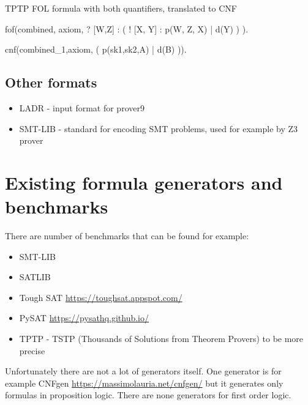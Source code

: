\begin{listing}[H]
  \caption{TPTP FOL formula with both quantifiers, translated to CNF}
\begin{tptpcode}
fof(combined, axiom,
 ? [W,Z] : ( ! [X, Y] : p(W, Z, X)  | d(Y) )
  ).

cnf(combined_1,axiom,
    ( p(sk1,sk2,A) | d(B) )).
\end{tptpcode}
\end{listing}

\subsection{Other formats}

\begin{itemize}
  \item \gls{LADR} - input format for prover9
  \item SMT-LIB - standard for encoding SMT problems, used for example by Z3 prover
\end{itemize}


\section{Existing formula generators and benchmarks}

There are number of benchmarks that can be found for example:

\begin{itemize}
  \item SMT-LIB \cite{BarFT-RR-17} 
  \item SATLIB \cite{Hol00}
  \item Tough SAT \url{https://toughsat.appspot.com/}
  \item PySAT \url{https://pysathq.github.io/}
  \item TPTP \cite{Sut17} - TSTP (Thousands of Solutions from Theorem Provers) to be more precise
\end{itemize}

Unfortunately there are not a lot of generators itself. One generator is for example CNFgen \url{https://massimolauria.net/cnfgen/} but it generates only formulas in proposition logic. There are none generators for first order logic.
